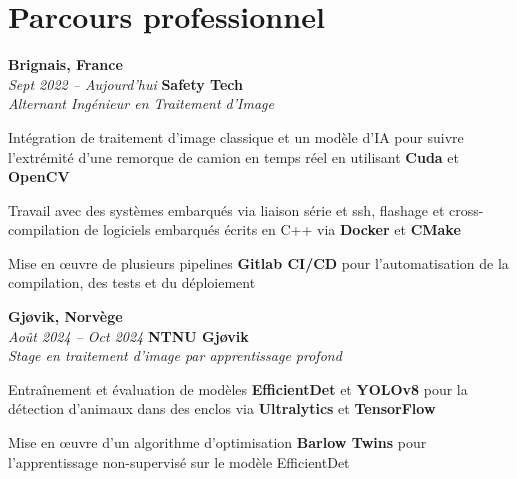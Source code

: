 
    \section{Parcours professionnel}
        \begin{twocolentry}{
			\textbf{Brignais, France} \\
			\textit{Sept 2022 – Aujourd'hui}
            }{
            \textbf{Safety Tech} \\
            \textit{Alternant Ingénieur en Traitement d'Image}
            }
        \end{twocolentry}

        \begin{onecolentry}
            \begin{highlights}
				\item Intégration de traitement d'image classique et un modèle d'IA pour suivre l'extrémité d'une remorque de camion en temps réel en utilisant \textbf{Cuda} et \textbf{OpenCV}
				\item Travail avec des systèmes embarqués via liaison série et ssh, flashage et cross-compilation de logiciels embarqués écrits en C++ via \textbf{Docker} et \textbf{CMake}
                \item Mise en œuvre de plusieurs pipelines \textbf{Gitlab CI/CD} pour l'automatisation de la compilation, des tests et du déploiement
            \end{highlights}
        \end{onecolentry}

        \begin{twocolentry}{
			\textbf{Gjøvik, Norvège} \\
			\textit{Août 2024 – Oct 2024}
            }{
			\textbf{NTNU Gjøvik} \\
			\textit{Stage en traitement d'image par apprentissage profond}
            }
        \end{twocolentry}

        \begin{onecolentry}
            \begin{highlights}
                \item Entraînement et évaluation de modèles \textbf{EfficientDet} et \textbf{YOLOv8} pour la détection d'animaux dans des enclos via \textbf{Ultralytics} et \textbf{TensorFlow}
                \item Mise en œuvre d'un algorithme d'optimisation \textbf{Barlow Twins} pour l'apprentissage non-supervisé sur le modèle EfficientDet
            \end{highlights}
        \end{onecolentry}

